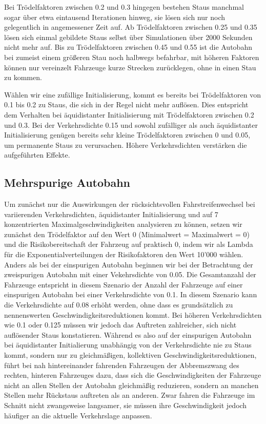 \documentclass[10pt, a4paper]{article}
\begin{document}
Bei Trödelfaktoren zwischen 0.2 und 0.3 hingegen bestehen Staus manchmal sogar über etwa eintausend Iterationen hinweg, sie lösen sich nur noch gelegentlich in angemessener Zeit auf. Ab Trödelfaktoren zwischen 0.25 und 0.35 lösen sich einmal gebildete Staus selbst über Simulationen über 2000 Sekunden nicht mehr auf. \textcolor{AI-BLUE}{Bis zu Trödelfaktoren zwischen 0.45 und 0.55 ist die Autobahn bei zumeist einem größeren Stau noch halbwegs befahrbar, mit höheren Faktoren können nur vereinzelt Fahrzeuge kurze Strecken zurücklegen, ohne in einen Stau zu kommen.}

Wählen wir eine zufällige Initialisierung, kommt es bereits bei Trödelfaktoren von 0.1 bis 0.2 zu Staus, die sich in der Regel nicht mehr auflösen. Dies entspricht dem Verhalten bei äquidistanter Initialisierung mit Trödelfaktoren zwischen 0.2 und 0.3.
Bei der Verkehrsdichte 0.15 und sowohl zufälliger als auch äquidistanter Initialisierung genügen bereits sehr kleine Trödelfaktoren zwischen 0 und 0.05, um permanente Staus zu verursachen. Höhere Verkehrsdichten verstärken die aufgeführten Effekte.

\subsection{Mehrspurige Autobahn}
\label{subsec:mehrspurig}

Um zunächst nur die Auswirkungen der rücksichtsvollen Fahrstreifenwechsel bei variierenden Verkehrsdichten, äquidistanter Initialisierung und auf 7 konzentrierten Maximalgeschwindigkeiten analysieren zu können, setzen wir zunächst den Trödelfaktor auf den Wert 0 (Minimalwert = Maximalwert = 0) und die Risikobereitschaft der Fahrzeug auf praktisch 0, indem wir als Lambda für die Exponentialverteilungen der Risikofaktoren den Wert 10'000 wählen.
Anders als bei der einspurigen Autobahn beginnen wir bei der Betrachtung der zweispurigen Autobahn mit einer Vekehrsdichte von 0.05. Die Gesamtanzahl der Fahrzeuge entspricht in diesem Szenario der Anzahl der Fahrzeuge auf einer einspurigen Autobahn bei einer Verkehrsdichte von 0.1.
In diesem Szenario kann die Verkehrsdichte auf 0.08 erhöht werden, ohne dass es grundsätzlich zu nennenswerten Geschwindigkeitsreduktionen kommt. Bei höheren Verkehrsdichten wie 0.1 oder 0.125 müssen wir jedoch das Auftreten zahlreicher, sich nicht auflösender Staus konstatieren.
Während es also auf der einspurigen Autobahn bei äquidistanter Initialierung unabhängig von der Verkehrsdichte nie zu Staus kommt, sondern nur zu gleichmäßigen, kollektiven Geschwindigkeitsreduktionen, führt bei nah hintereinander fahrenden Fahrzeugen der Abbremszwang des rechten, hinteren Fahrzeuges dazu, dass sich die Geschwindigkeiten der Fahrzeuge nicht an allen Stellen der Autobahn gleichmäßig reduzieren, sondern an manchen Stellen mehr Rückstaus auftreten als an anderen. Zwar fahren die Fahrzeuge im Schnitt nicht zwangsweise langsamer, sie müssen ihre Geschwindigkeit jedoch häufiger an die aktuelle Verkehrslage anpassen.
\end{document}
